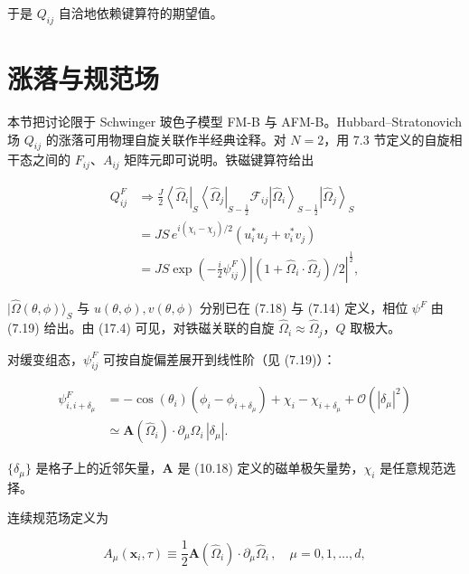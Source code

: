 于是 $Q_{ij}$ 自洽地依赖键算符的期望值。

\section{涨落与规范场}

本节把讨论限于 Schwinger 玻色子模型 FM-B 与 AFM-B。Hubbard--Stratonovich 场 $Q_{ij}$ 的涨落可用物理自旋关联作半经典诠释。对 $N = 2$，用 7.3 节定义的自旋相干态之间的 $F_{ij}$、$A_{ij}$ 矩阵元即可说明。铁磁键算符给出

\begin{align*}
Q _ {ij} ^ {F} & \Rightarrow \frac {J}{2} \left\langle \hat {\Omega} _ {i} \right|_{S} \left\langle \hat {\Omega} _ {j} \right|_{S - \frac {1}{2}} \mathcal {F} _ {ij} \left| \hat {\Omega} _ {i} \right\rangle_{S - \frac {1}{2}} \left| \hat {\Omega} _ {j} \right\rangle_{S}\\
& = J S \, e ^ {i ( \chi_ {i} - \chi_ {j} )/2} \left( u _ {i} ^ {*} u _ {j} + v _ {i} ^ {*} v _ {j} \right)\\
& = J S \exp \left( - \frac {i}{2} \psi_{ij} ^ {F} \right) \left| ( 1 + \hat {\Omega} _ {i} \cdot \hat {\Omega} _ {j} )/2 \right| ^ {\frac {1}{2}} ,
\tag{17.4}
\end{align*}

$|\hat{\Omega}(\theta,\phi)\rangle_{S}$ 与 $u(\theta,\phi), v(\theta,\phi)$ 分别已在 (7.18) 与 (7.14) 定义，相位 $\psi^{F}$ 由 (7.19) 给出。由 (17.4) 可见，对铁磁关联的自旋 $\hat{\Omega}_{i} \approx \hat{\Omega}_{j}$，$Q$ 取极大。

对缓变组态，$\psi_{ij}^{F}$ 可按自旋偏差展开到线性阶（见 (7.19)）：

\begin{align*}
\psi_{i, i + \delta_ {\mu}} ^ {F} & = - \cos ( \theta_ {i} ) \left( \phi_ {i} - \phi_{i + \delta_ {\mu}} \right) + \chi_ {i} - \chi_{i + \delta_ {\mu}} + \mathcal {O} \left( | \delta_ {\mu} | ^ {2} \right)\\
& \simeq \mathbf {A} ( \hat {\Omega} _ {i} ) \cdot \partial_ {\mu} \hat {\Omega} _ {i} \, | \delta_ {\mu} | .
\tag{17.5}
\end{align*}

$\{\delta_{\mu}\}$ 是格子上的近邻矢量，$\mathbf{A}$ 是 (10.18) 定义的磁单极矢量势，$\chi_{i}$ 是任意规范选择。

连续规范场定义为

\begin{equation*}
A _ {\mu} ( \mathbf {x} _ {i}, \tau ) \equiv \frac {1}{2} \mathbf {A} ( \hat {\Omega} _ {i} ) \cdot \partial_ {\mu} \hat {\Omega} _ {i} \, , \quad \mu = 0, 1, \dots , d ,
\tag{17.6}
\end{equation*}

